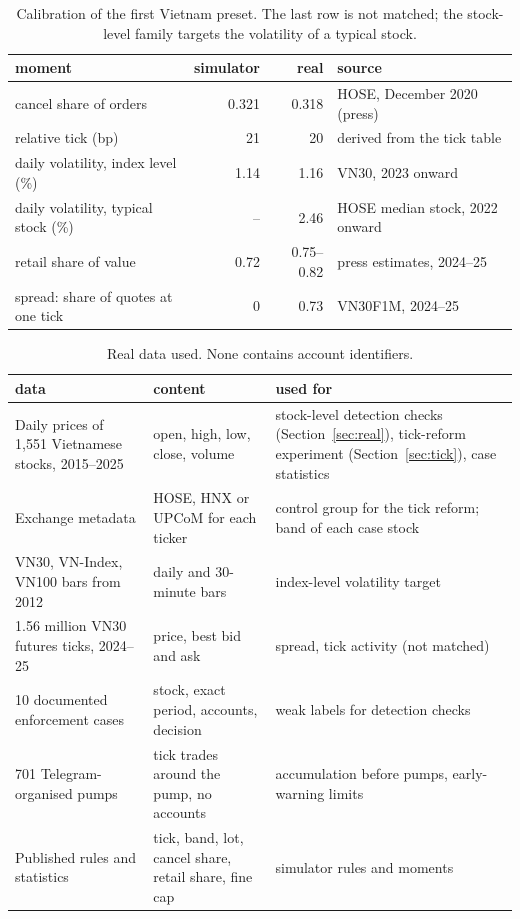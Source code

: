 \documentclass[11pt,a4paper]{article}
\begin{document}
\begin{table}[t]
\centering\small
\begin{tabular}{lrrl}
\toprule
moment & simulator & real & source\\
\midrule
cancel share of orders & 0.321 & 0.318 & HOSE, December 2020 (press)\\
relative tick (bp) & 21 & 20 & derived from the tick table\\
daily volatility, index level (\%) & 1.14 & 1.16 & VN30, 2023 onward\\
daily volatility, typical stock (\%) & -- & 2.46 & HOSE median stock, 2022 onward\\
retail share of value & 0.72 & 0.75--0.82 & press estimates, 2024--25\\
spread: share of quotes at one tick & 0 & 0.73 & VN30F1M, 2024--25\\
\bottomrule
\end{tabular}
\caption{Calibration of the first Vietnam preset. The last row is not matched; the stock-level family targets the volatility of a typical stock.}\label{tab:calib}
\end{table}

\begin{table}[t]
\centering\footnotesize
\begin{tabular}{p{4.2cm}p{4.3cm}p{5.2cm}}
\toprule
data & content & used for\\
\midrule
Daily prices of 1,551 Vietnamese stocks, 2015--2025 & open, high, low, close, volume & stock-level detection checks (Section~\ref{sec:real}), tick-reform experiment (Section~\ref{sec:tick}), case statistics\\
Exchange metadata & HOSE, HNX or UPCoM for each ticker & control group for the tick reform; band of each case stock\\
VN30, VN-Index, VN100 bars from 2012 & daily and 30-minute bars & index-level volatility target\\
1.56 million VN30 futures ticks, 2024--25 & price, best bid and ask & spread, tick activity (not matched)\\
10 documented enforcement cases & stock, exact period, accounts, decision & weak labels for detection checks\\
701 Telegram-organised pumps & tick trades around the pump, no accounts & accumulation before pumps, early-warning limits\\
Published rules and statistics & tick, band, lot, cancel share, retail share, fine cap & simulator rules and moments\\
\bottomrule
\end{tabular}
\caption{Real data used. None contains account identifiers.}\label{tab:data}
\end{table}
\end{document}
